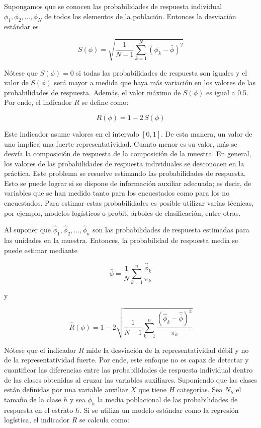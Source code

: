 \documentclass[
  12pt,
  spanish,
]{book}
\begin{document}
Supongamos que se conocen las probabilidades de respuesta individual
\(\phi_{1},\phi_{2},\ldots,\phi_{N}\) de todos los elementos de la población.
Entonces la desviación estándar es

\[
S\left(\phi\right)  =  \sqrt{\frac{1}{N-1}\sum_{k=1}^{N}\left(\phi_{k}-\bar{\phi}\right)^{2}}
\]

Nótese que \(S\left(\phi\right)=0\) si todas las probabilidades de respuesta
son iguales y el valor de \(S\left(\phi\right)\) será mayor a medida
que haya más variación en los valores de las probabilidades de respuesta. Además, el valor máximo de \(S\left(\phi\right)\) es igual a 0.5. Por ende, el indicador \(R\) se define como:

\[
R\left(\phi\right)=1-2\,S\left(\phi\right)
\]

Este indicador asume valores en el intervalo \(\left[0,1\right]\). De esta manera, un valor de uno implica una fuerte representatividad. Cuanto menor es su valor, más se desvía la composición de respuesta
de la composición de la muestra. En general, los valores de las probabilidades de respuesta individuales se desconocen en la práctica. Este problema se resuelve estimando las probabilidades de respuesta. Esto se puede lograr si se dispone de información auxiliar adecuada; es decir, de variables que se han medido tanto para los encuestados como para los no encuestados. Para estimar estas probabilidades es posible utilizar varias técnicas, por ejemplo, modelos logísticos o probit, árboles de clasificación, entre otras.

Al suponer que \(\hat{\phi}_{1},\hat{\phi}_{2},\ldots,\hat{\phi}_{n}\) son
las probabilidades de respuesta estimadas para las unidades en la muestra.
Entonces, la probabilidad de respuesta media se puede estimar mediante

\[
\hat{\bar{\phi}}  =  \frac{1}{N}\sum_{k=1}^{n}\frac{\hat{\phi}_{k}}{\pi_{k}}
\]

y

\[
\hat{R}\left(\phi\right)  =  1-2\sqrt{\frac{1}{N-1}\sum_{k=1}^{n}\frac{\left(\hat{\phi}_{k}-\hat{\bar{\phi}}\right)^{2}}{\pi_{k}}}
\]

Nótese que el indicador \(R\) mide la desviación de la representatividad débil y no de la representatividad fuerte. Por ende, este enfoque no es capaz de detectar y cuantificar las diferencias
entre las probabilidades de respuesta individual dentro de las clases obtenidas al cruzar las variables auxiliares. Suponiendo que las clases están definidas por una variable auxiliar \(X\) que tiene \(H\) categorías. Sea \(N_{h}\) el tamaño de la clase \(h\) y sea \(\bar{\phi}_{h}\) la media poblacional de las probabilidades de respuesta en el estrato \(h\). Si se utiliza un modelo estándar como la regresión logística, el indicador \(R\) se calcula como:
\end{document}
